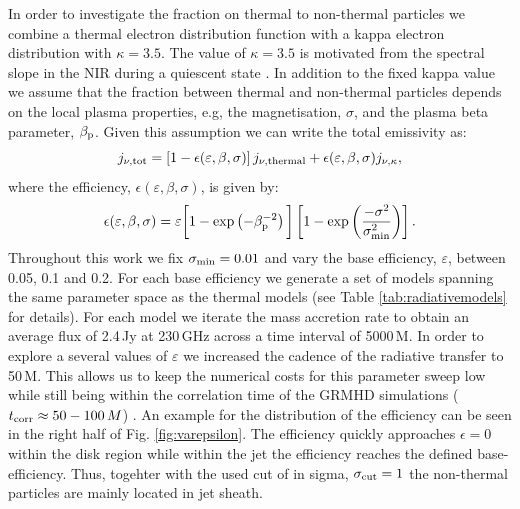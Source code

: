 In order to investigate the fraction on thermal to non-thermal particles we combine a thermal electron distribution function with a kappa electron distribution with $\kappa=3.5$. The value of $\kappa=3.5$ is motivated from the spectral slope in the NIR during a quiescent state . In addition to the fixed kappa value we assume that the fraction between thermal and non-thermal particles depends on the local plasma properties, e.g, the magnetisation, $\sigma$, and the plasma beta parameter, $\beta_{\rm p}$. Given this assumption we can write the total emissivity as:
\begin{equation}
j_{\nu,\rm{tot}}=\left[1-\epsilon(\varepsilon,\beta, \sigma)\right] j_{\nu,\rm{thermal}} + \epsilon(\varepsilon,\beta, \sigma) j_{\nu, \kappa},
\label{eq:kappaeff}
\end{equation}
where the efficiency, $\epsilon(\varepsilon,\beta,\sigma)$, is given by:
\begin{equation}
    \epsilon(\varepsilon,\beta,\sigma)=\varepsilon\bigg[1 - \exp\left(-\beta_{\rm p}^{-2}\right)\bigg]
    \left[1-\exp\left(\frac{-\sigma^2}{\sigma_{\rm min}^2}\right)\right].
    \label{eq:efficiencybetasigma}
\end{equation}
Throughout this work we fix $\sigma_{\rm min}=0.01$ and vary the base efficiency, $\varepsilon$, between 0.05, 0.1 and 0.2. For each base efficiency we generate a set of models spanning the same parameter space as the thermal models (see Table \ref{tab:radiativemodels} for details). For each model we iterate the mass accretion rate to obtain an average flux of 2.4\,Jy at 230\,GHz across a time interval of 5000\,M. In order to explore a several values of $\varepsilon$ we increased the cadence of the radiative transfer to 50\,M. This allows us to keep the numerical costs for this parameter sweep low while still being within the correlation time of the GRMHD simulations ($t_{\rm corr}\approx 50-100\,M$) . An example for the distribution of the efficiency can be seen in the right half of  Fig. \ref{fig:varepsilon}. The efficiency quickly approaches $\epsilon=0$ within the disk region while within the jet the efficiency reaches the defined base-efficiency. Thus, togehter with the used cut of in sigma, $\sigma_{\rm cut}=1$ the non-thermal particles are mainly located in jet sheath.

